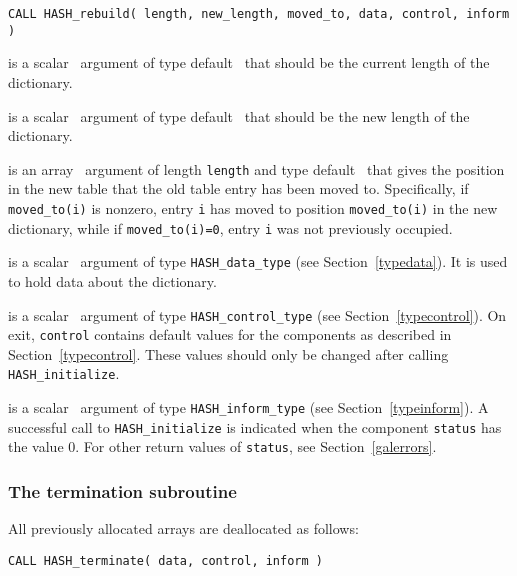 \documentclass{galahad}
\newcommand{\packagename}{HASH}
\begin{document}
\hspace{8mm}
{\tt CALL \packagename\_rebuild( length, new\_length, moved\_to, data, control, inform )}

\vspace*{-2mm}
\begin{description}

 is a scalar \intentin\ argument of type default \integer\ that
should be the current length of the dictionary.

 is a scalar \intentin\ argument of type default \integer\ 
that should be the new length of the dictionary.

 is an array \intentout\ argument of length {\tt length} and 
type default \integer\ that gives the position in the new table
that the old table entry has been moved to. Specifically, if 
{\tt moved\_to(i)} is nonzero, entry {\tt i} has moved to position
{\tt moved\_to(i)} in the new dictionary, while if {\tt moved\_to(i)=0},
entry {\tt i} was not previously occupied.

 is a scalar \intentinout\ argument of type
{\tt \packagename\_data\_type}
(see Section~\ref{typedata}). It is used to hold data about the dictionary.

 is a scalar \intentin\ argument of type
{\tt \packagename\_control\_type}
(see Section~\ref{typecontrol}).
On exit, {\tt control} contains default values for the components as
described in Section~\ref{typecontrol}.
These values should only be changed after calling
{\tt \packagename\_initialize}.

 is a scalar \intentinout\ argument of type
{\tt \packagename\_inform\_type}
(see Section~\ref{typeinform}). A successful call to
{\tt \packagename\_initialize}
is indicated when the  component {\tt status} has the value 0.
For other return values of {\tt status}, see Section~\ref{galerrors}.

\end{description}


\subsubsection{The  termination subroutine}
All previously allocated arrays are deallocated as follows:
\vspace*{1mm}

\hspace{8mm}
{\tt CALL \packagename\_terminate( data, control, inform )}
\end{document}
